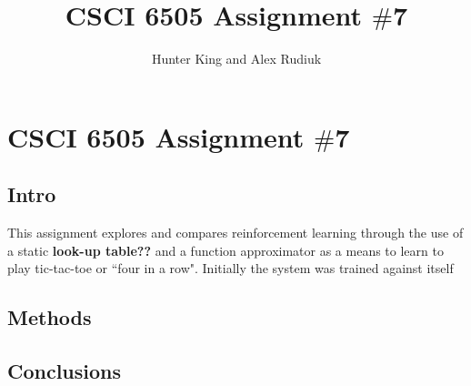 \documentclass[12pt,a4paper]{article}
\author{Hunter King and Alex Rudiuk}
\title{CSCI 6505 Assignment $\#$7}
\begin{document}
\section*{CSCI 6505 Assignment $\#$7}
\subsection*{Intro}
This assignment explores and compares reinforcement learning through the use of a static \textbf{look-up table??} and a function approximator as a means to learn to play tic-tac-toe or ``four in a row". Initially the system was trained against itself
\subsection*{Methods}

\subsection*{Conclusions}
\end{document}
